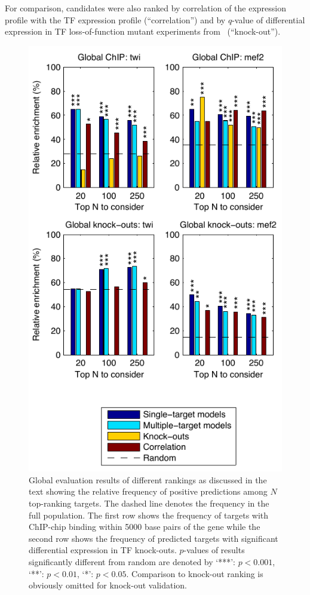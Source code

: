 \documentclass{pnastwo}
\begin{document}
\begin{article}
For comparison, candidates were also ranked by correlation of the
expression profile with the TF expression profile (``correlation'')
and by $q$-value of differential expression in TF loss-of-function mutant
experiments from~\cite{Sandmann2006a,Sandmann2007} (``knock-out''). 

\begin{figure}[tb]
  \centering
  \includegraphics{dros_global_evaluation}
  \caption{Global evaluation results of different rankings as
    discussed in the text showing the relative frequency of positive
    predictions among $N$ top-ranking targets.
    The dashed line
    denotes the frequency in the full population.
    The first row shows the frequency of targets with ChIP-chip
    binding within 5000 base pairs of the gene
    while the second row shows the frequency of
    predicted targets with significant differential
    expression in TF knock-outs.
    $p$-values of results significantly different from random are
    denoted by `***': $p <
    0.001$, `**': $p < 0.01$, `*': $p < 0.05$.
    Comparison to knock-out ranking is obviously omitted for knock-out
    validation. \label{fig:dros_global_evaluation}
  }
\end{figure}


\end{article}
\end{document}
